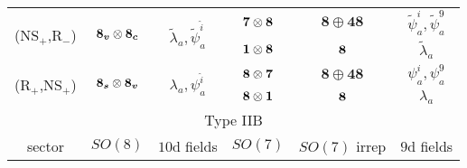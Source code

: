 {\begin{tabular}{|cccccc|}
    \multicolumn{1}{|c|}{\multirow{2}{*}{(NS$_+$,R$_-$)}}  & \multicolumn{1}{c|}{\multirow{2}{*}{$\boldsymbol{8_v} \otimes \boldsymbol{8_c}$}} & \multicolumn{1}{c|}{\multirow{2}{*}{$\tilde{\lambda}_a, \tilde{\psi}^{\hat{i}}_a$}}      & \multicolumn{1}{c|}{$\boldsymbol{7} \otimes \boldsymbol{8}$}                          & \multicolumn{1}{c|}{$\boldsymbol{8} \oplus\boldsymbol{48}$}                           & $\tilde{\psi}^i_a, \tilde{\psi}^9_a$ \\ \cline{4-6} 
    \multicolumn{1}{|c|}{}                                 & \multicolumn{1}{c|}{}                                 & \multicolumn{1}{c|}{}                                                                    & \multicolumn{1}{c|}{$\boldsymbol{1} \otimes \boldsymbol{8}$}                              & \multicolumn{1}{c|}{$\boldsymbol{8}$}                                                         & $\tilde{\lambda}_a$                  \\ \hline
    \multicolumn{1}{|c|}{\multirow{2}{*}{(R$_+$,NS$_+$)}}  & \multicolumn{1}{c|}{\multirow{2}{*}{$\boldsymbol{8_s}\otimes\boldsymbol{8_v}$}}   & \multicolumn{1}{c|}{\multirow{2}{*}{${\lambda}_a, {\psi}^{\hat{i}}_a$}}                  & \multicolumn{1}{c|}{$\boldsymbol{8}\otimes\boldsymbol{7}$}                            & \multicolumn{1}{c|}{$\boldsymbol{8} \oplus\boldsymbol{48}$}                           & $\psi^i_a, \psi^9_a$                 \\ \cline{4-6} 
    \multicolumn{1}{|c|}{}                                 & \multicolumn{1}{c|}{}                                 & \multicolumn{1}{c|}{}                                                                    & \multicolumn{1}{c|}{$\boldsymbol{8} \otimes \boldsymbol{1}$}                              & \multicolumn{1}{c|}{$\boldsymbol{8}$}                                                         & $\lambda_a$                          \\ \hline
    \multicolumn{6}{|c|}{Type IIB}                                                                                                                                                                                                                                                                                                                                                                                   \\ \hline
    \multicolumn{1}{|c|}{sector}                           & \multicolumn{1}{c|}{$SO(8)$}                          & \multicolumn{1}{c|}{$10$d fields}                                                        & \multicolumn{1}{c|}{$SO(7)$}                                          & \multicolumn{1}{c|}{$SO(7)$ irrep}                                                    & $9$d fields                          \\ \hline

\end{tabular}}
